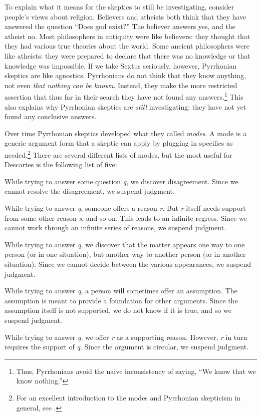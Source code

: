 To explain what it means for the skeptics to still be investigating, consider people's views about religion. Believers and atheists both think that they have answered the question ``Does god exist?'' The believer answers yes, and the atheist no. Most philosophers in antiquity were like believers: they thought that they had various true theories about the world. Some ancient philosophers were like atheists: they were prepared to declare that there was no knowledge or that knowledge was impossible. If we take Sextus seriously, however, Pyrrhonian skeptics are like agnostics. Pyrrhonians do not think that they know anything, not even \textit{that nothing can be known}. Instead, they make the more restricted assertion that thus far in their search they have not found any answers.\footnote{Thus, Pyrrhonians avoid the naive inconsistency of saying, ``We know that we know nothing.''} This also explains why Pyrrhonian skeptics are \textit{still} investigating: they have not yet found any conclusive answers.

Over time Pyrrhonian skeptics developed what they called \textit{modes}. A mode is a generic argument form that a skeptic can apply by plugging in specifics as needed.\footnote{For an excellent introduction to the modes and Pyrrhonian skepticism in general, see \textcite{annasbarnes1994}.} There are several different lists of modes, but the most useful for Descartes is the following list of five:

\begin{description}[leftmargin=*,widest="Infinite Regress"]
    \item[Disagreement] While trying to answer some question \textit{q}, we discover disagreement. Since we cannot resolve the disagreement, we suspend judgment.
    \item[Infinite regress] While trying to answer \textit{q}, someone offers a reason \textit{r}. But \textit{r} itself needs support from some other reason \textit{s}, and so on. This leads to an infinite regress. Since we cannot work through an infinite series of reasons, we suspend judgment.
    \item[Relativity] While trying to answer \textit{q}, we discover that the matter appears one way to one person (or in one situation), but another way to another person (or in another situation). Since we cannot decide between the various appearances, we suspend judgment.
    \item[Hypothesis] While trying to answer \textit{q}, a person will sometimes offer an assumption. The assumption is meant to provide a foundation for other arguments. Since the assumption itself is not supported, we do not know if it is true, and so we suspend judgment.
    \item[Circularity] While trying to answer \textit{q}, we offer \textit{r} as a supporting reason. However, \textit{r} in turn requires the support of \textit{q}. Since the argument is circular, we suspend judgment.
\end{description}

